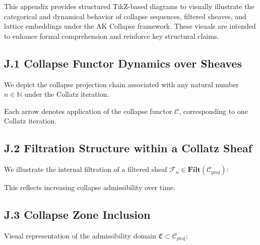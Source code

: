 \documentclass[11pt]{article}
\begin{document}
This appendix provides structured TikZ-based diagrams to visually illustrate the categorical and dynamical behavior of collapse sequences, filtered sheaves, and lattice embeddings under the AK Collapse framework. These visuals are intended to enhance formal comprehension and reinforce key structural claims.

\subsection*{J.1 Collapse Functor Dynamics over Sheaves}

We depict the collapse projection chain associated with any natural number \( n \in \mathbb{N} \) under the Collatz iteration.

\begin{center}
\end{center}

\noindent Each arrow denotes application of the collapse functor \( \mathcal{C} \), corresponding to one Collatz iteration.

\subsection*{J.2 Filtration Structure within a Collatz Sheaf}

We illustrate the internal filtration of a filtered sheaf \( \mathcal{F}_n \in \mathbf{Filt}(\mathcal{C}_{\mathrm{proj}}) \):

\begin{center}
\end{center}

\noindent This reflects increasing collapse admissibility over time.

\subsection*{J.3 Collapse Zone Inclusion}

Visual representation of the admissibility domain \( \mathfrak{C} \subset \mathcal{C}_{\mathrm{proj}} \):
\end{document}
